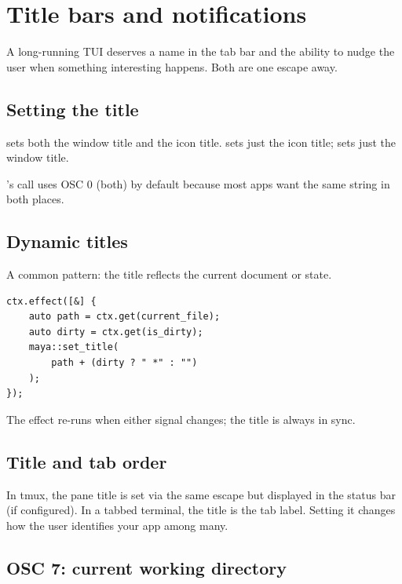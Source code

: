 \chapter{Title bars and notifications}
\label{ch:titles}

\begin{aside}
A long-running TUI deserves a name in the tab bar and the
ability to nudge the user when something interesting happens.
Both are one escape away.
\end{aside}

\section{Setting the title}

\code{ESC ] 0 ; TITLE BEL} sets both the window title and the
icon title. \code{ESC ] 1 ; TITLE BEL} sets just the icon
title; \code{ESC ] 2 ; TITLE BEL} sets just the window title.

\maya{}'s  call uses OSC 0 (both) by default
because most apps want the same string in both places.

\section{Dynamic titles}

A common pattern: the title reflects the current document or
state.

\begin{lstlisting}
ctx.effect([&] {
    auto path = ctx.get(current_file);
    auto dirty = ctx.get(is_dirty);
    maya::set_title(
        path + (dirty ? " *" : "")
    );
});
\end{lstlisting}

The effect re-runs when either signal changes; the title is
always in sync.

\section{Title and tab order}

In tmux, the pane title is set via the same escape but
displayed in the status bar (if configured). In a tabbed
terminal, the title is the tab label. Setting it changes how
the user identifies your app among many.

\section{OSC 7: current working directory}

